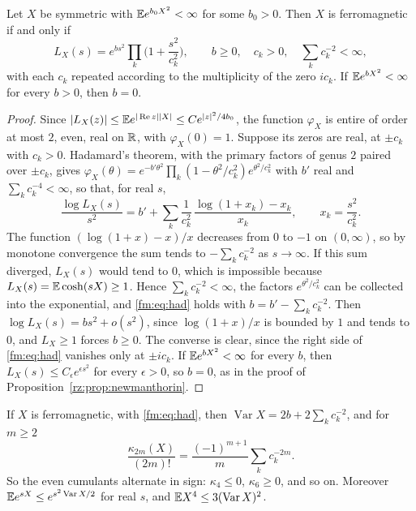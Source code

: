 \begin{theorem}\label{fm:thm:hadamard}
Let $X$ be symmetric with $\mathbb{E} e^{b_0X^2}<\infty$ for some $b_0>0$. Then $X$ is ferromagnetic if and only if
\begin{equation}\label{fm:eq:had}
L_X(s)=e^{bs^2}\prod_k\Big(1+\frac{s^2}{c_k^2}\Big),\qquad b\ge0,\quad c_k>0,\quad\sum_kc_k^{-2}<\infty,
\end{equation}
with each $c_k$ repeated according to the multiplicity of the zero $ic_k$. If $\mathbb{E} e^{bX^2}<\infty$ for every $b>0$, then $b=0$.
\end{theorem}

\begin{proof}
Since $|L_X(z)|\le\mathbb{E} e^{|\operatorname{Re} z||X|}\le Ce^{|z|^2/4b_0}$, the function $\varphi_X$ is entire of order at most $2$, even, real on $\mathbb{R}$, with $\varphi_X(0)=1$. Suppose its zeros are real, at $\pm c_k$ with $c_k>0$. Hadamard's theorem, with the primary factors of genus $2$ paired over $\pm c_k$, gives $\varphi_X(\theta)=e^{-b'\theta^2}\prod_k(1-\theta^2/c_k^2)e^{\theta^2/c_k^2}$ with $b'$ real and $\sum_kc_k^{-4}<\infty$, so that, for real $s$,
\[
\frac{\log L_X(s)}{s^2}=b'+\sum_k\frac1{c_k^2}\,\frac{\log(1+x_k)-x_k}{x_k},\qquad x_k=\frac{s^2}{c_k^2}.
\]
The function $(\log(1+x)-x)/x$ decreases from $0$ to $-1$ on $(0,\infty)$, so by monotone convergence the sum tends to $-\sum_kc_k^{-2}$ as $s\to\infty$. If this sum diverged, $L_X(s)$ would tend to $0$, which is impossible because $L_X(s)=\mathbb{E}\cosh(sX)\ge1$. Hence $\sum_kc_k^{-2}<\infty$, the factors $e^{\theta^2/c_k^2}$ can be collected into the exponential, and \eqref{fm:eq:had} holds with $b=b'-\sum_kc_k^{-2}$. Then $\log L_X(s)=bs^2+o(s^2)$, since $\log(1+x)/x$ is bounded by $1$ and tends to $0$, and $L_X\ge1$ forces $b\ge0$. The converse is clear, since the right side of \eqref{fm:eq:had} vanishes only at $\pm ic_k$. If $\mathbb{E} e^{bX^2}<\infty$ for every $b$, then $L_X(s)\le C_\epsilon e^{\epsilon s^2}$ for every $\epsilon>0$, so $b=0$, as in the proof of Proposition~\ref{rz:prop:newmanthorin}.
\end{proof}

\begin{corollary}\label{fm:cor:cum}
If $X$ is ferromagnetic, with \eqref{fm:eq:had}, then $\operatorname{Var}X=2b+2\sum_kc_k^{-2}$, and for $m\ge2$
\begin{equation}\label{fm:eq:cum}
\frac{\kappa_{2m}(X)}{(2m)!}=\frac{(-1)^{m+1}}m\sum_kc_k^{-2m}.
\end{equation}
So the even cumulants alternate in sign: $\kappa_4\le0$, $\kappa_6\ge0$, and so on. Moreover $\mathbb{E} e^{sX}\le e^{s^2\operatorname{Var}X/2}$ for real $s$, and $\mathbb{E} X^4\le3(\operatorname{Var}X)^2$.
\end{corollary}

